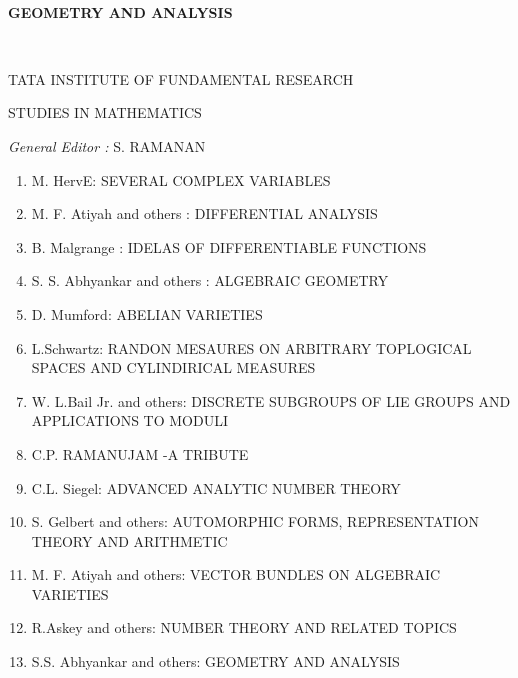 ~\vfill

\begin{center}
{\Large\bf GEOMETRY AND ANALYSIS}
\medskip

\thispagestyle{empty}
\end{center}

\vfill\eject

~\phantom{a}
\thispagestyle{empty}

\begin{center}
TATA INSTITUTE OF FUNDAMENTAL RESEARCH

STUDIES IN MATHEMATICS

\bigskip
{\em General Editor :} S. \textsc{RAMANAN}
\end{center}

\begin{enumerate}
\item M. HervE: \textsc{SEVERAL COMPLEX VARIABLES} 

\item M. F. Atiyah and others : \textsc{DIFFERENTIAL ANALYSIS}

\item B. Malgrange : \textsc{IDELAS OF DIFFERENTIABLE FUNCTIONS}

\item S. S. Abhyankar and others : \textsc{ALGEBRAIC GEOMETRY}

\item D. Mumford:   \textsc{ABELIAN VARIETIES}

\item L.Schwartz: \textsc{RANDON MESAURES ON ARBITRARY TOPLOGICAL SPACES AND CYLINDIRICAL MEASURES}

\item W. L.Bail Jr. and others: \textsc{DISCRETE SUBGROUPS OF LIE GROUPS AND APPLICATIONS TO MODULI}

\item C.P. RAMANUJAM -A TRIBUTE

\item C.L. Siegel:  \textsc{ADVANCED ANALYTIC NUMBER THEORY}

\item S. Gelbert and others: \textsc{AUTOMORPHIC FORMS, REPRESENTATION THEORY AND ARITHMETIC}

\item M. F. Atiyah and others: \textsc{VECTOR BUNDLES ON ALGEBRAIC VARIETIES}

\item R.Askey and others: \textsc{NUMBER THEORY AND RELATED TOPICS}

\item S.S. Abhyankar and others: \textsc{GEOMETRY AND ANALYSIS}
\end{enumerate}

